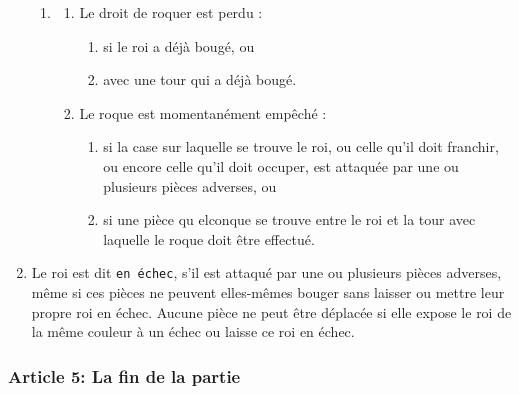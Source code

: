 \begin{enumerate}
\begin{enumerate}
    \item 
        \begin{enumerate}
        \item Le droit de roquer est perdu :
            \begin{enumerate}
                \item si le roi a déjà bougé, ou
                \item avec une tour qui a déjà bougé.
            \end{enumerate}
        \item Le roque est momentanément empêché :
            \begin{enumerate}
                \item si la case sur laquelle se trouve le roi, ou celle qu’il doit franchir, ou encore celle 
                qu’il doit occuper, est attaquée par une ou plusieurs pièces adverses, ou
                \item si une pièce qu
                elconque se trouve entre le roi et la tour avec laquelle le roque doit 
                être effectué.
            \end{enumerate}
        \end{enumerate}
    \end{enumerate}
    \item Le  roi  est  dit \texttt{en  échec}, s’il est attaqué par une ou plusieurs pièces adverses, même  si  ces  pièces  ne peuvent  elles-mêmes  bouger  sans  laisser  ou  mettre  leur  propre  roi en  échec.  Aucune  pièce  ne  peut être déplacée si elle expose le roi de la même couleur à un échec ou laisse ce roi en échec.
\end{enumerate}

\subsubsection{Article 5: La fin de la partie}

